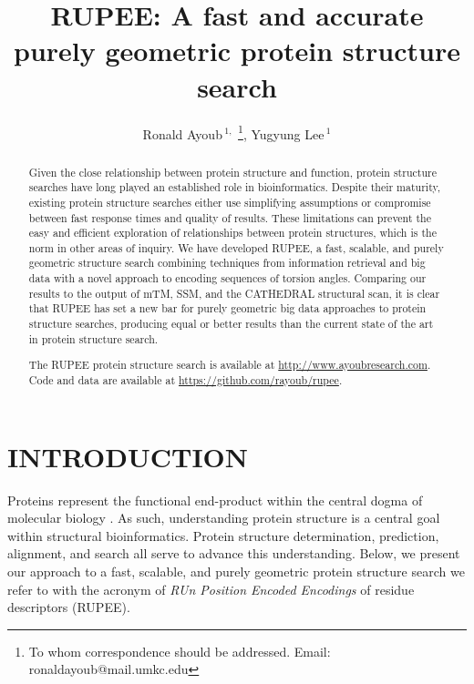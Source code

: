 \documentclass[letter,center,fleqn]{NAR}
\begin{document}
\title{RUPEE: A fast and accurate purely geometric protein structure search}

\author{%
Ronald Ayoub\,$^{1,}$%
\footnote{To whom correspondence should be addressed.
Email: ronaldayoub@mail.umkc.edu},
Yugyung Lee\,$^{1}$}

\address{%
$^{1}$
School of Computing and Engineering, 
University of Missouri at Kansas City,
5110 Rockhill Road,
Kansas City, MO 64110, USA}



\maketitle

\begin{abstract}
Given the close relationship between protein structure and function, protein structure searches have long played an established role in bioinformatics. 
Despite their maturity, existing protein structure searches either use simplifying assumptions or compromise between fast response times and quality of results. 
These limitations can prevent the easy and efficient exploration of relationships between protein structures, which is the norm in other areas of inquiry.
We have developed RUPEE, a fast, scalable, and purely geometric structure search combining techniques from information retrieval and big data with a novel approach to encoding sequences of torsion angles. 
Comparing our results to the output of mTM, SSM, and the CATHEDRAL structural scan, it is clear that RUPEE has set a new bar for purely geometric big data approaches to protein structure searches, producing equal or better results than the current state of the art in protein structure search.

The RUPEE protein structure search is available at \url{http://www.ayoubresearch.com}. Code and data are available at \url{https://github.com/rayoub/rupee}.
\end{abstract}

\section{INTRODUCTION}

Proteins represent the functional end-product within the central dogma of molecular biology \cite{Crick1970}.
As such, understanding protein structure is a central goal within structural bioinformatics. 
Protein structure determination, prediction, alignment, and search all serve to advance this understanding. 
Below, we present our approach to a fast, scalable, and purely geometric protein structure search we refer to with the acronym of \emph{RUn Position Encoded Encodings} of residue descriptors (RUPEE).
\end{document}

